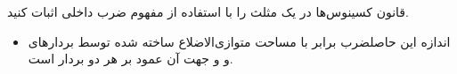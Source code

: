 
\begin{ELexample}{}

قانون کسینوس‌ها در یک مثلث را با استفاده از مفهوم ضرب داخلی اثبات کنید.


\begin{ELsolution}



\end{ELsolution}

\end{ELexample}

\ELhold


\begin{ELdefinition}{}


\end{ELdefinition}

\begin{ELunit}

\begin{itemize}
\tightlist
\item
  اندازه این حاصلضرب برابر با مساحت متوازی‌الاضلاع ساخته شده توسط بردارهای  و  و جهت آن عمود بر هر دو بردار است.
\end{itemize}


\end{ELunit}

